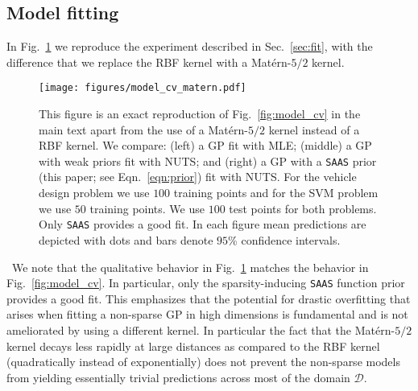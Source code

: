 \documentclass[accepted]{uai2021} %
\newcommand{\priorname}{{\texttt {SAAS}}}
\newcommand{\DD}{\mathcal{D}}
\begin{document}
\subsection{Model fitting}
In Fig.~\ref{fig:model_cv_matern} we reproduce the experiment described in
Sec.~\ref{sec:fit}, with the difference that we replace
the RBF kernel with a Mat\'ern-$5/2$ kernel.

\begin{figure}[!ht]
  \texttt{[image: figures/model\_cv\_matern.pdf]}
  \caption{This figure is an exact reproduction of Fig.~\ref{fig:model_cv} in the main
  text apart from the use of a Mat\'ern-$5/2$ kernel instead of a RBF kernel.
  We compare:
  (left) a GP fit with MLE;
  (middle) a GP with weak priors fit with NUTS;
  and (right) a GP with a \priorname{} prior (this paper; see Eqn.~\eqref{eqn:prior}) fit with NUTS.
  For the vehicle design problem we use $100$ training points and for the SVM problem we use $50$ training points.
  We use $100$ test points for both problems.
  Only \priorname{} provides a good fit.
  In each figure mean predictions are depicted with dots and bars denote $95$\% confidence intervals.
  }
  \label{fig:model_cv_matern}
\end{figure}
\, \newline
We note that the qualitative behavior
in Fig.~\ref{fig:model_cv_matern} matches the behavior in Fig.~\ref{fig:model_cv}. In
particular, only the sparsity-inducing \priorname{} function prior
provides a good fit. This emphasizes that the potential for drastic overfitting that arises
when fitting a non-sparse GP in high dimensions is fundamental and is not ameliorated by
using a different kernel. In particular the fact that the Mat\'ern-$5/2$ kernel decays
less rapidly at large distances as compared to the RBF kernel (quadratically instead of
exponentially) does not prevent the non-sparse models from yielding essentially trivial predictions
across most of the domain $\DD$.
\end{document}
